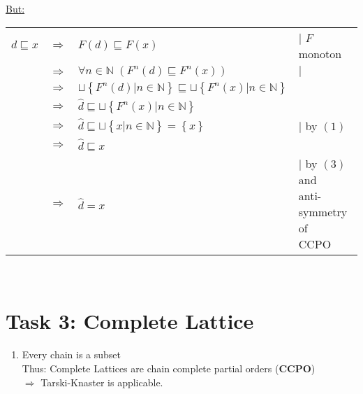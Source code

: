 \documentclass[12pt]{scrartcl}
\begin{document}
\begin{enumerate}
		\hspace*{0.5cm}\underline{But:}\\
		\hspace*{1cm}\begin{tabular}{ccll}
		$d\sqsubseteq x$ & $\Rightarrow$ & $F\left(d\right)\sqsubseteq F\left(x\right)$ & $|$ $F$ monoton\\
		& $\Rightarrow$ & $\forall n\in\mathbb{N}\; \left(F^{n}\left(d\right)\sqsubseteq F^{n}\left(x\right)\right)$ & $|$\\
		& $\Rightarrow$ & $\sqcup\left\{F^{n}\left(d\right)|n\in\mathbb{N}\right\}\sqsubseteq\sqcup\left\{F^{n}\left(x\right)|n\in\mathbb{N}\right\}$ &\\
		& $\Rightarrow$ & $\hat{d}\sqsubseteq\sqcup\left\{F^{n}\left(x\right)|n\in\mathbb{N}\right\}$ &\\
		& $\Rightarrow$ & $\hat{d}\sqsubseteq\sqcup\left\{x|n\in\mathbb{N}\right\}=\left\{x\right\}$ & $|$ by $\left(1\right)$\\
		& $\Rightarrow$ & $\hat{d}\sqsubseteq x$ &\\
		& $\Rightarrow$ & $\hat{d}=x$ & \parbox[t]{5cm}{$|$ by $\left(3\right)$ and\\ anti-symmetry of\\ CCPO}\\
		\end{tabular}\\[0.5cm]
	\end{enumerate}

	\section*{Task 3: Complete Lattice}

	\begin{enumerate}
	\item[] Every chain is a subset\\
			Thus: Complete Lattices are chain complete partial orders (\textbf{CCPO})\\
			\quad $\Rightarrow$ Tarski-Knaster is applicable.	
	\end{enumerate}
	
\end{document}
